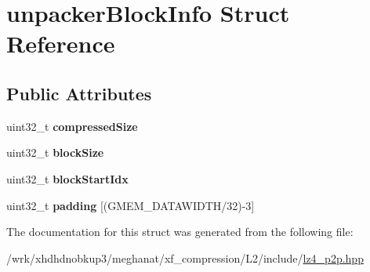 \hypertarget{structunpackerBlockInfo}{\section{unpacker\-Block\-Info Struct Reference}
\label{structunpackerBlockInfo}
}
\subsection*{Public Attributes}
\begin{DoxyCompactItemize}
\item 
\hypertarget{structunpackerBlockInfo_a741d08923eefe7ae2979c3f511af6b57}{uint32\-\_\-t {\bfseries compressed\-Size}}\label{structunpackerBlockInfo_a741d08923eefe7ae2979c3f511af6b57}

\item 
\hypertarget{structunpackerBlockInfo_add12586bec0bc42280a57955c79836fc}{uint32\-\_\-t {\bfseries block\-Size}}\label{structunpackerBlockInfo_add12586bec0bc42280a57955c79836fc}

\item 
\hypertarget{structunpackerBlockInfo_ad1ff9bae24778d0633e2f0e6a47f1546}{uint32\-\_\-t {\bfseries block\-Start\-Idx}}\label{structunpackerBlockInfo_ad1ff9bae24778d0633e2f0e6a47f1546}

\item 
\hypertarget{structunpackerBlockInfo_a8898717738b6d1e46890f71340badd1d}{uint32\-\_\-t {\bfseries padding} \mbox{[}(G\-M\-E\-M\-\_\-\-D\-A\-T\-A\-W\-I\-D\-T\-H/32)-\/3\mbox{]}}\label{structunpackerBlockInfo_a8898717738b6d1e46890f71340badd1d}

\end{DoxyCompactItemize}


The documentation for this struct was generated from the following file\-:\begin{DoxyCompactItemize}
\item 
/wrk/xhdhdnobkup3/meghanat/xf\-\_\-compression/\-L2/include/\hyperlink{lz4__p2p_8hpp}{lz4\-\_\-p2p.\-hpp}\end{DoxyCompactItemize}
